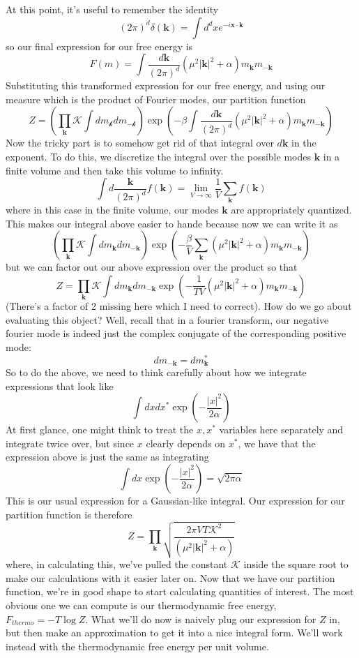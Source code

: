 \documentclass[11pt, oneside]{article}   	%
\begin{document}
At this point, it's useful to remember the identity \[ ( 2 \pi )^d \delta (\mathbf{k} ) = \int d^d x e^{- i \mathbf{x} \cdot \mathbf{k}} \] so our final expression for our free energy is \[ F(m ) = \int \frac{ d \mathbf{k} }{ (2 \pi ) ^d } \left( \mu^ 2 |\mathbf{k} |^2 + \alpha \right) m_\mathbf{k} m_{ - \mathbf{k} } \]   
Substituting this transformed expression for our free energy, and using our measure which is the product of Fourier modes, our partition function \[ Z = \left( \prod_\mathbf{k} \mathcal{K} \int dm_\mathcal{k } dm_{ - \mathcal{k} } \right) \exp \left(  - \beta \int \frac{ d\mathbf{k} } { (2 \pi )^d } \left( \mu^2 |\mathbf{k}|^2 + \alpha \right) m_\mathbf{k} m_{ - \mathbf{k}} \right) \]
Now the tricky part is to somehow get rid of that integral over $d \mathbf{k}$ in the exponent. To do this, we discretize the integral over the possible modes $\mathbf{k} $ in a finite volume and then take this volume to infinity. \[ \int d \frac{ \mathbf{k} }{ (2 \pi)^d } f( \mathbf{k} ) = \lim_{V \rightarrow \infty} \frac{ 1 }{ V} \sum_\mathbf{k} f(\mathbf{k} ) \] where in this case in the finite volume, our modes $\mathbf{k} $ are appropriately quantized. This makes our integral above easier to hande because now we can write it as \[ \left( \prod_\mathbf{k} \mathcal { K } \int dm_\mathbf{k} dm_{  - \mathbf{k} } \right) \exp \left( - \frac{ \beta}{ V } \sum_{ \mathbf{ k } } ( \mu^2 |\mathbf{ k} |^2 + \alpha )m_\mathbf{k} m_{ - \mathbf{k} } \right) \] but we can factor out our above expression over the product so that \[ Z = \prod_{ \mathbf{k} } \mathcal {K} \int dm_\mathbf{k} dm_\mathbf{-k} \exp \left(  - \frac{1}{ TV}  ( \mu^2 |\mathbf{k}|^2 + \alpha ) m_\mathbf{k} m_\mathbf{ -k } \right) \] 
(There's a factor of 2 missing here which I need to correct). How do we go about evaluating this object? Well, recall that in a fourier transform, our negative fourier mode is indeed just the complex conjugate of the corresponding positive mode: 
\[ 
dm_{  - \mathbf{k}}  = dm_\mathbf{ k}^* 
\] 
So to do the above, we need to think carefully about how we integrate expressions that look like 
\[ 
\int dx dx^* \exp \left(  - \frac{ |x|^2 }{ 2 \alpha } \right)  
\] 
At first glance, one might think to treat the $x, x^* $ variables here separately and integrate twice over, but since $x$ clearly depends on $x^*$, we have that the expression above is just the same as integrating 
\[ 
\int dx \exp \left(  - \frac{ |x|^2 }{ 2 \alpha } \right) = \sqrt{ 2 \pi \alpha }  
\] 
This is our usual expression for a Gaussian-like integral. Our expression for our partition function is therefore 
\[ 
Z = \prod_{ \mathbf{k}} \sqrt{ \frac{ 2 \pi V T \mathcal{ K }^2 }{ ( \mu^2 |\mathbf{ k} |^2 + \alpha  ) } }  
\]   
where, in calculating this, we've pulled the constant $\mathcal{K}$ inside the square root to make our calculations with it easier later on. Now that we have our partition function, we're in good shape to start calculating quantities of interest. The most obvious one we can compute is our thermodynamic free energy, $F_{thermo} =  - T \log Z$. What we'll do now is naively plug our expression for $Z$ in, but then make an approximation to get it into a nice integral form. We'll work instead with the thermodynamic free energy per unit volume. 
\end{document}
